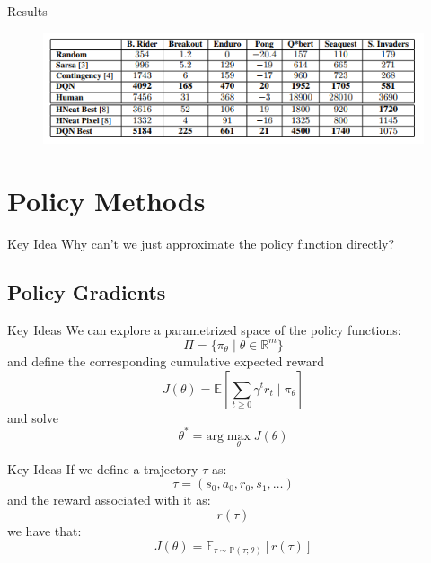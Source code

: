 \documentclass{beamer}
\begin{document}
	\begin{frame}{Results}
		\begin{figure}
			\centering
			\includegraphics[width=1.2\textheight]{dqn_results.png}
		\end{figure}
	\end{frame}
	
	\section*{Policy Methods}
	
	\begin{frame}
		\begin{block}{Key Idea}
			Why can't we just approximate the policy function directly?
		\end{block}
	\end{frame}
	
	\subsection*{Policy Gradients}
	
	\begin{frame}
		\begin{block}{Key Ideas}
			We can explore a parametrized space of the policy functions:
			$$ \Pi = \{ \pi_\theta \mid \theta \in \mathbb{R}^m \} $$
			and define the corresponding cumulative expected reward
			$$ J(\theta) = \mathbb{E} \left[ \sum_{t\geq0}\gamma^t r_t  \mid \pi_\theta \right] $$
			and solve
			$$ \theta^* = \text{arg} \max_\theta J(\theta) $$
		\end{block}
	\end{frame}
	
	\begin{frame}
		\begin{block}{Key Ideas}
			If we define a trajectory $ \tau $ as:
			$$ \tau = \left( s_0,a_0,r_0,s_1,\ldots \right) $$
			and the reward associated with it as:
			$$ r(\tau) $$
			we have that:
			$$ J(\theta) = \mathbb{E}_{\tau \sim \mathbb{P}(\tau ; \theta) } \left[ r(\tau) \right] $$
		\end{block}
	\end{frame}
	
\end{document}
